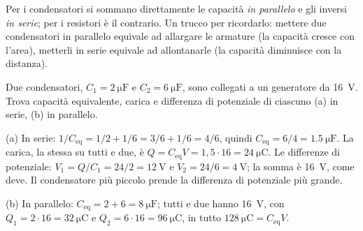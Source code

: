\begin{attenzione}
Per i condensatori si sommano direttamente le capacità \emph{in parallelo} e gli inversi \emph{in serie}; per i resistori è il contrario. Un trucco per ricordarlo: mettere due condensatori in parallelo equivale ad allargare le armature (la capacità cresce con l'area), metterli in serie equivale ad allontanarle (la capacità diminuisce con la distanza).
\end{attenzione}

\begin{esempio}
Due condensatori, $C_1 = \SI{2}{\micro\farad}$ e $C_2 = \SI{6}{\micro\farad}$, sono collegati a un generatore da \SI{16}{\volt}. Trova capacità equivalente, carica e differenza di potenziale di ciascuno (a) in serie, (b) in parallelo.

(a) In serie: $1/C_{\text{eq}} = 1/2 + 1/6 = 3/6 + 1/6 = 4/6$, quindi $C_{\text{eq}} = 6/4 = \SI{1,5}{\micro\farad}$. La carica, la stessa su tutti e due, è $Q = C_{\text{eq}} V = 1{,}5 \cdot 16 = \SI{24}{\micro\coulomb}$. Le differenze di potenziale: $V_1 = Q/C_1 = 24/2 = \SI{12}{\volt}$ e $V_2 = 24/6 = \SI{4}{\volt}$; la somma è \SI{16}{\volt}, come deve. Il condensatore più piccolo prende la differenza di potenziale più grande.

(b) In parallelo: $C_{\text{eq}} = 2 + 6 = \SI{8}{\micro\farad}$; tutti e due hanno \SI{16}{\volt}, con $Q_1 = 2 \cdot 16 = \SI{32}{\micro\coulomb}$ e $Q_2 = 6 \cdot 16 = \SI{96}{\micro\coulomb}$, in tutto $\SI{128}{\micro\coulomb} = C_{\text{eq}} V$.
\end{esempio}

